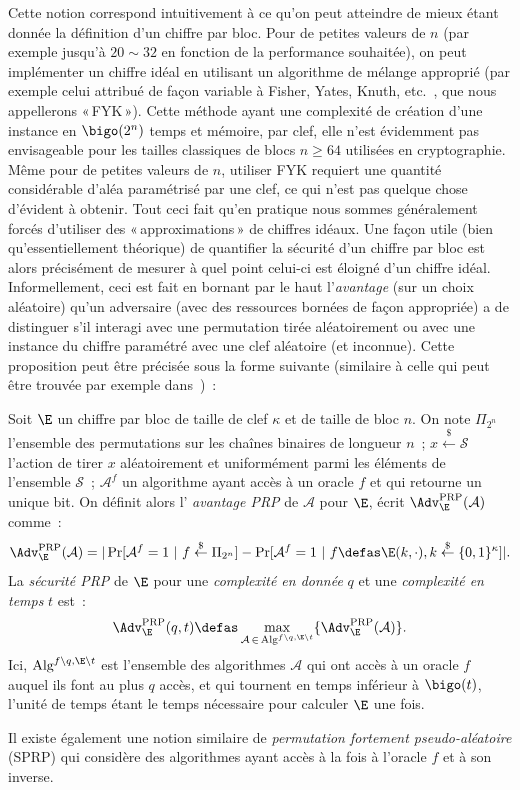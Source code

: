 Cette notion correspond intuitivement à ce qu'on peut atteindre de mieux étant donnée la définition d'un chiffre par bloc.
Pour de petites valeurs de $n$ (par exemple jusqu'à $20 \sim 32$ en fonction de la performance souhaitée), on peut
implémenter un chiffre idéal en utilisant un algorithme de mélange approprié (par exemple celui attribué de façon
variable à Fisher, Yates, Knuth, etc.~\cite{uniform_shuffle}, que nous appellerons «\,FYK\,»).
Cette méthode ayant une complexité de création d'une instance en $\bigo(2^n)$ temps et mémoire, par clef, elle n'est
évidemment pas envisageable pour les tailles classiques de blocs $n \geq 64$ utilisées en cryptographie.
Même pour de petites valeurs de $n$, utiliser FYK requiert une quantité considérable d'aléa paramétrisé par une clef,
ce qui n'est pas quelque chose d'évident à obtenir. 
Tout ceci fait qu'en pratique nous sommes généralement forcés d'utiliser des «\,approximations\,» de chiffres idéaux.
Une façon utile (bien qu'essentiellement théorique) de quantifier la sécurité d'un chiffre par bloc est alors précisément
de mesurer à quel point celui-ci est éloigné d'un chiffre idéal.
Informellement, ceci est fait en bornant par le haut l'\emph{avantage} (sur un choix aléatoire) qu'un adversaire
(avec des ressources bornées de façon appropriée) a de distinguer s'il interagi avec une permutation tirée aléatoirement
ou avec une instance du chiffre paramétré avec une clef aléatoire (et inconnue). Cette proposition peut être précisée
sous la forme suivante (similaire à celle qui peut être trouvée par exemple dans~\cite{DBLP:journals/jcss/BellareKR00})~:

\begin{fdefi}
Soit $\E$ un chiffre par bloc de taille de clef $\kappa$ et de taille de bloc $n$.
On note 
$\Pi_{2^n}$ l'ensemble des permutations sur les chaînes binaires de longueur $n$~; $x \overset{\$}{\leftarrow} \mathcal{S}$
l'action de tirer $x$ aléatoirement et uniformément parmi les éléments de l'ensemble $\mathcal{S}$~; $\mathcal{A}^{f}$
un algorithme ayant accès à un oracle $f$ et qui retourne un unique bit.
On définit alors 
l' \emph{avantage PRP} de $\mathcal{A}$ pour $\E$, écrit $\Adv^{\text{PRP}}_{\E}(\mathcal{A})$ comme~:
\[
\Adv^{\text{PRP}}_{\E}(\mathcal{A}) = |\Pr[\mathcal{A}^f = 1~|~f \overset{\$}{\leftarrow} \Pi_{2^n}] - \Pr[\mathcal{A}^f = 1~|~f \defas \E(k,\cdot), k \overset{\$}{\leftarrow} \{0,1\}^\kappa]|.
\]
La \emph{sécurité PRP} de $\E$ pour une \emph{complexité en donnée} $q$ et une \emph{complexité en temps} $t$ est~:
\[
\Adv^{\text{PRP}}_{\E}(q,t) \defas \max_{\mathcal{A}\,\in\,\text{Alg}^{f\backslash q, \E\backslash t}} \{\Adv^{\text{PRP}}_{\E}(\mathcal{A})\}.
\]
Ici, 
$\text{Alg}^{f\backslash q, \E\backslash t}$ est l'ensemble des algorithmes $\mathcal{A}$ qui ont accès à un oracle $f$ auquel ils font au plus $q$ accès,
et qui tournent en temps inférieur à
$\bigo(t)$, l'unité de temps étant le temps nécessaire pour calculer $\E$ une fois.
\label{def:fprp}
\end{fdefi}
Il existe également une notion similaire de \emph{permutation fortement pseudo-aléatoire} (SPRP) qui considère des algorithmes ayant accès à la fois à l'oracle $f$ et à son inverse.

